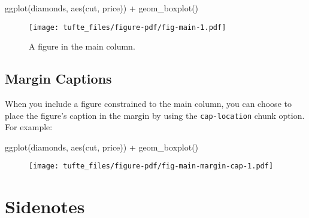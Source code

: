\documentclass[
  letterpaper,
  DIV=11,
  numbers=noendperiod,
  oneside]{scrartcl}
\newenvironment{Shaded}{\begin{snugshade}}{\end{snugshade}}
\newcommand{\FunctionTok}[1]{\textcolor[rgb]{0.28,0.35,0.67}{#1}}
\newcommand{\NormalTok}[1]{\textcolor[rgb]{0.00,0.23,0.31}{#1}}
\newcommand{\SpecialCharTok}[1]{\textcolor[rgb]{0.37,0.37,0.37}{#1}}
\begin{document}
\begin{Shaded}
\begin{Highlighting}[]
\FunctionTok{ggplot}\NormalTok{(diamonds, }\FunctionTok{aes}\NormalTok{(cut, price)) }\SpecialCharTok{+} \FunctionTok{geom\_boxplot}\NormalTok{()}
\end{Highlighting}
\end{Shaded}

\begin{figure}[H]

{\centering \texttt{[image: tufte\_files/figure-pdf/fig-main-1.pdf]}

}

\caption{\label{fig-main}A figure in the main column.}

\end{figure}

\hypertarget{margin-captions}{%
\subsection{Margin Captions}\label{margin-captions}}

When you include a figure constrained to the main column, you can choose
to place the figure's caption in the margin by using the
\texttt{cap-location} chunk option. For example:

\begin{Shaded}
\begin{Highlighting}[]
\FunctionTok{ggplot}\NormalTok{(diamonds, }\FunctionTok{aes}\NormalTok{(cut, price)) }\SpecialCharTok{+} \FunctionTok{geom\_boxplot}\NormalTok{()}
\end{Highlighting}
\end{Shaded}

\begin{figure}[H]


{\centering \texttt{[image: tufte\_files/figure-pdf/fig-main-margin-cap-1.pdf]}

}

\end{figure}

\hypertarget{sidenotes}{%
\section{Sidenotes}\label{sidenotes}}
\end{document}
